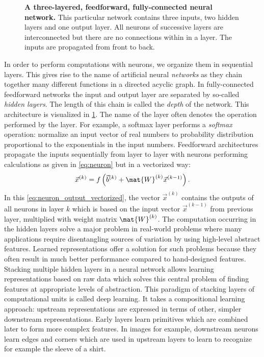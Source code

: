 \begin{figure}[htbp]
	\centering
	
	\caption[A three-layered, feedforward, fully-connected neural network.]{\textbf{A three-layered, feedforward, fully-connected neural network.} This particular network contains three inputs, two hidden layers and one output layer. All neurons of successive layers are interconnected but there are no connections within in a layer. The inputs are propagated from front to back.}
	\label{fig:three-layer-nn}
\end{figure}

In order to perform computations with neurons, we organize them in sequential layers. This gives rise to the name of artificial neural \textit{networks} as they chain together many different functions in a directed acyclic graph. In fully-connected feedforward networks the input and output layer are separated by so-called \textit{hidden layers}. The length of this chain is called the \emph{depth} of the network. This architecture is visualized in \cref{fig:three-layer-nn}. The name of the layer often denotes the operation performed by the layer. For example, a softmax layer performs a \emph{softmax} operation: normalize an input vector of real numbers to probability distribution proportional to the exponentials in the input numbers. Feedforward architectures propagate the inputs sequentially from layer to layer with neurons performing calculations as given in \cref{eq:neuron} but in a vectorized way:
\begin{equation} \label{eq:neuron_output_vectorized}
	\vec{x}^{(k)}=f\left(\vec{b}^{(k)} + \mat{W}^{(k)} \vec{x}^{(k-1)}\right).
\end{equation}
In this \cref{eq:neuron_output_vectorized}, the vector $\vec{x}^{(k)}$ contains the outputs of all neurons in layer $k$ which is based on the input vector $\vec{x}^{(k-1)}$ from previous layer, multiplied with weight matrix $\mat{W}^{(k)}$. The computation occurring in the hidden layers solve a major problem in real-world problems where many applications require disentangling sources of variation by using high-level abstract features. Learned representations offer a solution for such problems because they often result in much better performance compared to hand-designed features. Stacking multiple hidden layers in a neural network allows learning representations based on raw data which solves this central problem of finding features at appropriate levels of abstraction. This paradigm of stacking layers of computational units is called deep learning. It takes a compositional learning approach: upstream representations are expressed in terms of other, simpler downstream representations. Early layers learn primitives which are combined later to form more complex features. In images for example, downstream neurons learn edges and corners which are used in upstream layers to learn to recognize for example the sleeve of a shirt.


